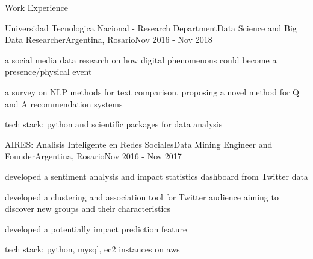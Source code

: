 \documentclass{article}
\newlength{\tabin}
\newlength{\secsep}
\newcommand{\lineunder}{\vspace*{-8pt} \\ \hspace*{-6pt} \hrulefill \\ \vspace*{-15pt}}
\newenvironment{tabbedsection}[1]{
  \begin{list}{}{
      \setlength{\itemsep}{0pt}
      \setlength{\labelsep}{0pt}
      \setlength{\labelwidth}{0pt}
      \setlength{\leftmargin}{\tabin}
      \setlength{\rightmargin}{\tabin}
      \setlength{\listparindent}{0pt}
      \setlength{\parsep}{0pt}
      \setlength{\parskip}{0pt}
      \setlength{\partopsep}{0pt}
      \setlength{\topsep}{#1}
    }
  \item[]
}{\end{list}}
\newenvironment{resume_section}[1]{
  \filbreak
  \vspace{2\secsep}
  \textsc{\large#1}
  \lineunder
  \begin{tabbedsection}{\secsep}
}{\end{tabbedsection}}
\newenvironment{subitems}{
  \renewcommand{\labelitemi}{-}
  \begin{itemize}
      \setlength{\labelsep}{1em}
}{\end{itemize}}
\newenvironment{resume_employer}[4]{
  \vspace{\secsep}
  \textbf{#1} \\ 
  \indent {\small #2} \hfill {\footnotesize#3 (#4)}
  \begin{tabbedsection}{0pt}
  \begin{subitems}
}{\end{subitems}\end{tabbedsection}}
\begin{document}
\begin{resume_section}{Work Experience}
  \begin{resume_employer}{Universidad Tecnologica Nacional - Research Department}{Data Science and Big Data Researcher}{Argentina, Rosario}{Nov 2016 - Nov 2018}
    \item a social media data research on how digital phenomenons could become a presence/physical event
    \item a survey on NLP methods for text comparison, proposing a novel method for Q and A recommendation systems
    \item tech stack: python and scientific packages for data analysis
  \end{resume_employer}
  
  \begin{resume_employer}{AIRES: Analisis Inteligente en Redes Sociales}{Data Mining Engineer and Founder}{Argentina, Rosario}{Nov 2016 - Nov 2017}
    \item developed a sentiment analysis and impact statistics dashboard from Twitter data 
    \item developed a clustering and association tool for Twitter audience aiming to discover new groups and their characteristics
    \item developed a potentially impact prediction feature
    \item tech stack: python, mysql, ec2 instances on aws
  \end{resume_employer}  
\end{resume_section}
\end{document}
